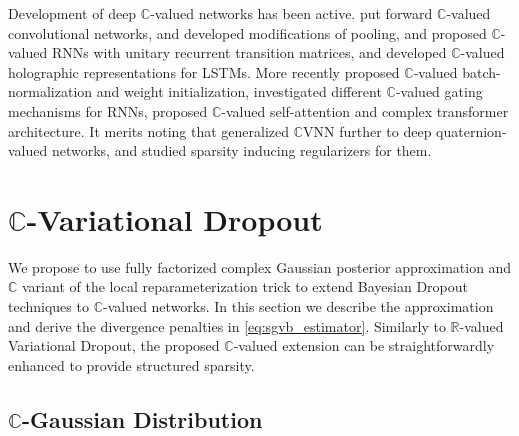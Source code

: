 \documentclass[a4paper,10pt,twocolumn]{article}
\newcommand{\real}{\mathbb{R}}
\newcommand{\cplx}{\mathbb{C}}
\newcommand{\important}[1]{\textbf{\!\colorbox{red}{#1}\!}}
\newcommand{\todo}[1]{{\color{blue} [TODO]} \important{#1}}
\begin{document}
Development of deep $\cplx$-valued networks has been active. \citet{haensch_complex-valued_2010}
put forward $\cplx$-valued convolutional networks, \citet{guberman_complex_2016} and
\citet{popa_complex-valued_2017} developed modifications of pooling, \citet{arjovsky_unitary_2016}
and \citet{wisdom_full-capacity_2016} proposed $\cplx$-valued RNNs with unitary recurrent
transition matrices, and \citet{danihelka_associative_2016} developed $\cplx$-valued
holographic representations for LSTMs. More recently \citet{trabelsi_deep_2018} proposed
$\cplx$-valued batch-normalization and weight initialization, \citet{wolter_complex_2018}
investigated different $\cplx$-valued gating mechanisms for RNNs, \citet{yang_complex_2019}
proposed $\cplx$-valued self-attention and complex transformer architecture. It merits
noting that \citet{gaudet_deep_2018} generalized $\cplx$VNN further to deep quaternion-valued
networks, and \citet{vecchi_compressing_2020} studied sparsity inducing regularizers for
them.





\section{$\cplx$-Variational Dropout} %
\label{sec:c_variational_dropout}

We propose to use fully factorized complex Gaussian posterior approximation and $\cplx$
variant of the local reparameterization trick to extend Bayesian Dropout techniques to
$\cplx$-valued networks. In this section we describe the approximation and derive the
divergence penalties in \eqref{eq:sgvb_estimator}. Similarly to $\real$-valued Variational Dropout,
the proposed $\cplx$-valued extension can be straightforwardly enhanced to provide
structured sparsity.


\subsection{$\cplx$-Gaussian Distribution} %
\label{sub:c_gauss_and_local_rep}
\end{document}
